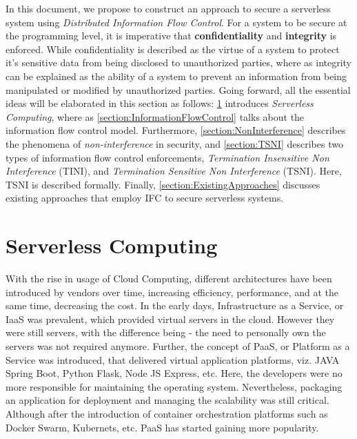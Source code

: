 In this document, we propose to construct an approach to secure a serverless system using \textit{Distributed Information Flow Control}. For a system to be secure at the programming level, it is imperative that \textbf{confidentiality} and \textbf{integrity} is enforced. While confidentiality is described as the virtue of a system to protect it's sensitive data from being disclosed to unauthorized parties, where as integrity can be explained as the ability of a system to prevent an information from being manipulated or modified by unauthorized parties. Going forward, all the essential ideas will be elaborated in this section as follows: \ref{section:ServerlessComputing} introduces \textit{Serverless Computing}, where as \ref{section:InformationFlowControl} talks about the information flow control model. Furthermore, \ref{section:NonInterference} describes the phenomena of \textit{non-interference} in security, and \ref{section:TSNI} describes two types of information flow control enforcements, \textit{Termination Insensitive Non Interference} (TINI), and \textit{Termination Sensitive Non Interference} (TSNI). Here, TSNI is described formally. Finally, \ref{section:ExistingApproaches} discusses existing approaches that employ IFC to secure serverless systems.

\section{Serverless Computing}
\label{section:ServerlessComputing}
With the rise in usage of Cloud Computing, different architectures have been introduced by vendors over time, increasing efficiency, performance, and at the same time, decreasing the cost. In the early days, Infrastructure as a Service, or IaaS was prevalent, which provided virtual servers in the cloud. However they were still servers, with the difference being - the need to personally own the servers was not required anymore. Further, the concept of PaaS, or Platform as a Service was introduced, that delivered virtual application platforms, viz. JAVA Spring Boot, Python Flask, Node JS Express, etc. Here, the developers were no more responsible for maintaining the operating system. Nevertheless, packaging an application for deployment and  managing the scalability was still critical. Although after the introduction of container orchestration platforms such as Docker Swarm, Kubernets, etc. PaaS has started gaining more popularity.


